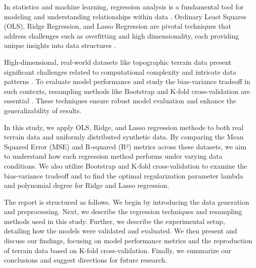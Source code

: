 In statistics and machine learning, regression analysis is a fundamental tool for modeling and understanding relationships within data \cite{hastie2009elements}. Ordinary Least Squares (OLS), Ridge Regression, and Lasso Regression are pivotal techniques that address challenges such as overfitting and high dimensionality, each providing unique insights into data structures \cite{hoerl1970ridge}\cite{tibshirani1996lasso}.
\newline

High-dimensional, real-world datasets like topographic terrain data present significant challenges related to computational complexity and intricate data patterns \cite{bellman1961adaptive}. To evaluate model performance and study the bias-variance tradeoff in such contexts, resampling methods like Bootstrap and K-fold cross-validation are essential \cite{efron1993bootstrap}\cite{arlot2010survey}. These techniques ensure robust model evaluation and enhance the generalizability of results.
\newline

In this study, we apply OLS, Ridge, and Lasso regression methods to both real terrain data and uniformly distributed synthetic data. By comparing the Mean Squared Error (MSE) and R-squared (R²) metrics across these datasets, we aim to understand how each regression method performs under varying data conditions. We also utilize Bootstrap and K-fold cross-validation to examine the bias-variance tradeoff and to find the optimal regularization parameter lambda and polynomial degree for Ridge and Lasso regression.
\newline 

The report is structured as follows. We begin by introducing the data generation and preprocessing. Next, we describe the regression techniques and resampling methods used in this study. Further, we describe the experimental setup, detailing how the models were validated and evaluated. We then present and discuss our findings, focusing on model performance metrics and the reproduction of terrain data based on K-fold cross-validation. Finally, we summarize our conclusions and suggest directions for future research.
